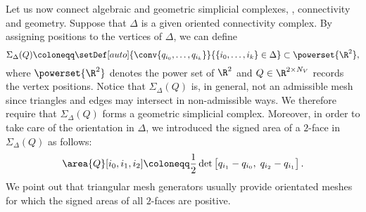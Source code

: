 Let us now connect algebraic and geometric simplicial complexes, \ie, connectivity and geometry.
Suppose that $\Delta$ is a given oriented connectivity complex.
By assigning positions to the vertices of $\Delta$, we can define
\begin{equation}
	\label{eq:collection_of_convex_hulls}
	\Sigma_\Delta(Q)
	\coloneqq
	\setDef[auto]{\conv\{q_{i_0}, \ldots, q_{i_k}\}}{\{i_0, \ldots, i_k\} \in \Delta}
	\subset
	\powerset{\R^2}
	,
\end{equation}
where $\powerset{\R^2}$ denotes the power set of $\R^2$ and $Q \in \R^{2\times N_V}$ records the vertex positions.
Notice that $\Sigma_\Delta(Q)$ is, in general, not an admissible mesh since triangles and edges may intersect in non-admissible ways.
We therefore require that $\Sigma_\Delta(Q)$ forms a geometric simplicial complex.
Moreover, in order to take care of the orientation in $\Delta$, we introduced the signed area of a $2$-face in $\Sigma_\Delta(Q)$ as follows:
\begin{equation}
	\label{eq:signed_area}
	\area{Q}[i_0,i_1,i_2]
	\coloneqq
	\frac{1}{2} \det
	\begin{bmatrix}
		q_{i_1} - q_{i_0}, \; q_{i_2} - q_{i_1}
	\end{bmatrix}
	.
\end{equation}
We point out that triangular mesh generators usually provide orientated meshes for which the signed areas of all $2$-faces are positive.

